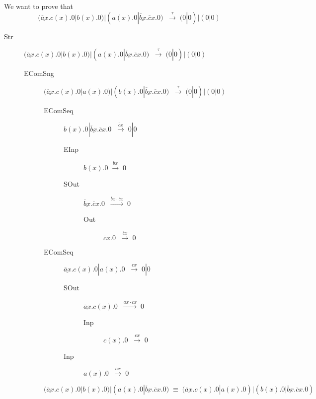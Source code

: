 \begin{example}
  We want to prove that 
  \[
    (\underline{\overline{a}x}.c(x).0|b(x).0)|(a(x).0|\underline{\overline{b}x}.\overline{c}x.0)\;
      \;\xrightarrow{\tau}\; 
	(0|0)|(0|0)
  \]



  \begin{description}
    \item[Str]
      $(\underline{\overline{a}x}.c(x).0|b(x).0)|(a(x).0|\underline{\overline{b}x}.\overline{c}x.0)\;
	\;\xrightarrow{\tau}\; 
	  (0|0)|(0|0)$
      \begin{description}
	\item[EComSng] 
	  $(\underline{\overline{a}x}.c(x).0|a(x).0)|(b(x).0|\underline{\overline{b}x}.\overline{c}x.0)\;
	    \;\xrightarrow{\tau}\;
	      (0|0)|(0|0)$
	  \begin{description}
	    \item[EComSeq]
	      $b(x).0|\underline{\overline{b}x}.\overline{c}x.0\;
		\;\xrightarrow{\overline{c}x}\;
		  0|0$
	      \begin{description}
		\item[EInp]
		  $b(x).0
		    \;\xrightarrow{bx}\;
		      0$
		\item[SOut]
		  $\underline{\overline{b}x}.\overline{c}x.0\;
		    \;\xrightarrow{\overline{b}x\cdot \overline{c}x}\;
		      0$
		  \begin{description}
		    \item[Out]
		      $\overline{c}x.0\;
			\;\xrightarrow{\overline{c}x}\;
			  0$
		  \end{description}
	      \end{description}
	    \item[EComSeq]
	      $\underline{\overline{a}x}.c(x).0|a(x).0\;
		\;\xrightarrow{cx}\;
		  0|0$
	      \begin{description}
		\item[SOut]
		  $\underline{\overline{a}x}.c(x).0\;
		    \;\xrightarrow{\overline{a}x\cdot cx}\;
		      0$
		  \begin{description}
		    \item[Inp]
		      $c(x).0\;
			\;\xrightarrow{cx}\;
			  0$
		  \end{description}
		\item[Inp]
		  $a(x).0\;
		    \;\xrightarrow{ax}\;
		      0$
	      \end{description}
	  \end{description}
	\item[]
	  $(\underline{\overline{a}x}.c(x).0|b(x).0)|(a(x).0|\underline{\overline{b}x}.\overline{c}x.0)\;
	    \equiv\;
	      (\underline{\overline{a}x}.c(x).0|a(x).0)|(b(x).0|\underline{\overline{b}x}.\overline{c}x.0)$
      \end{description}
  \end{description}
\end{example}


